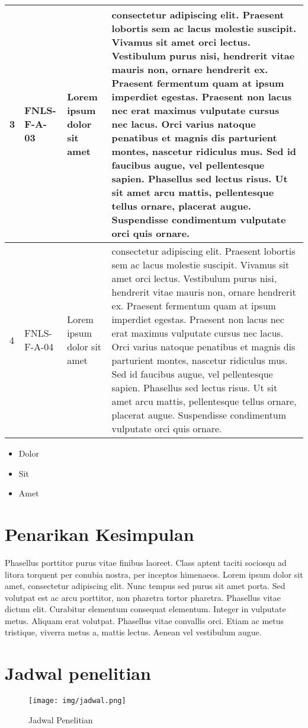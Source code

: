 \begin{longtable}[c]{|l|l|p{3cm}|p{7cm}|}
3 & FNLS-F-A-03 & Lorem ipsum dolor sit amet& consectetur adipiscing elit. Praesent lobortis sem ac lacus molestie suscipit. Vivamus sit amet orci lectus. Vestibulum purus nisi, hendrerit vitae mauris non, ornare hendrerit ex. Praesent fermentum quam at ipsum imperdiet egestas. Praesent non lacus nec erat maximus vulputate cursus nec lacus. Orci varius natoque penatibus et magnis dis parturient montes, nascetur ridiculus mus. Sed id faucibus augue, vel pellentesque sapien. Phasellus sed lectus risus. Ut sit amet arcu mattis, pellentesque tellus ornare, placerat augue. Suspendisse condimentum vulputate orci quis ornare.\\ \hline
4 & FNLS-F-A-04 & Lorem ipsum dolor sit amet& consectetur adipiscing elit. Praesent lobortis sem ac lacus molestie suscipit. Vivamus sit amet orci lectus. Vestibulum purus nisi, hendrerit vitae mauris non, ornare hendrerit ex. Praesent fermentum quam at ipsum imperdiet egestas. Praesent non lacus nec erat maximus vulputate cursus nec lacus. Orci varius natoque penatibus et magnis dis parturient montes, nascetur ridiculus mus. Sed id faucibus augue, vel pellentesque sapien. Phasellus sed lectus risus. Ut sit amet arcu mattis, pellentesque tellus ornare, placerat augue. Suspendisse condimentum vulputate orci quis ornare.\\ \hline
  \bottomrule
\end{longtable}

\begin{itemize}
\item Dolor
\item Sit
\item Amet
\end{itemize}


\section{Penarikan Kesimpulan}
\label{subsec:label}

Phasellus porttitor purus \textcite{warn} vitae finibus laoreet. Class
aptent taciti sociosqu ad litora torquent per conubia nostra, per
inceptos himenaeos. Lorem ipsum dolor sit amet, consectetur adipiscing
elit. Nunc tempus sed purus sit amet porta. Sed volutpat est ac arcu
porttitor, non pharetra tortor pharetra. Phasellus vitae dictum
elit. Curabitur elementum consequat elementum. Integer in vulputate
metus. Aliquam erat volutpat. Phasellus vitae convallis orci. Etiam ac
metus tristique, viverra metus a, mattis lectus. Aenean vel vestibulum
augue.

\section{Jadwal penelitian}
\label{subsec:label}

\begin{figure}[tph]
  \centering
  \texttt{[image: img/jadwal.png]}
  \caption{Jadwal Penelitian}
  \label{fig:jadwal-penelitian}
\end{figure}
